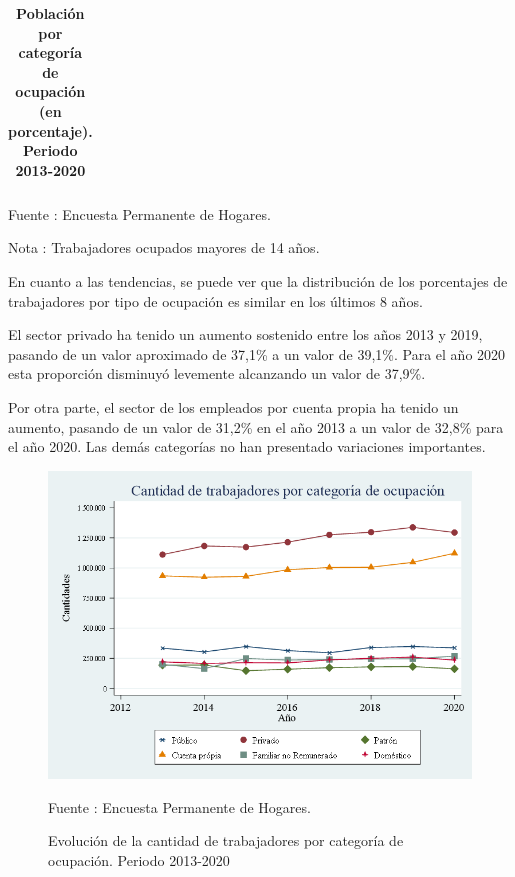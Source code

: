 \begin{table}[H]
\begin{center}
\scriptsize
\caption{\bf{Población por categoría de ocupación (en porcentaje). Periodo 2013-2020}}
\begin{tabular}{l|rrrrrr}

\end{tabular}
                    \item \footnotesize Fuente : Encuesta Permanente de Hogares. 
                    \item \footnotesize Nota : Trabajadores ocupados mayores de 14 años.
\end{center}
\end{table}

En cuanto a las tendencias, se puede ver que la distribución de los
porcentajes de trabajadores por tipo de ocupación es similar en los
últimos 8 años.

El sector privado ha tenido un aumento sostenido entre los años 2013 y
2019, pasando de un valor aproximado de 37,1\% a un valor de 39,1\%.
Para el año 2020 esta proporción disminuyó levemente alcanzando un valor
de 37,9\%.

Por otra parte, el sector de los empleados por cuenta propia ha tenido
un aumento, pasando de un valor de 31,2\% en el año 2013 a un valor de
32,8\% para el año 2020. Las demás categorías no han presentado
variaciones importantes.

\begin{figure}[H]
\begin{center}
                    \caption{Evolución de la cantidad de trabajadores por categoría de ocupación. Periodo 2013-2020}
                    \includegraphics[scale=0.55]{EPH_catepea.png}
                                    \item \footnotesize Fuente : Encuesta Permanente de Hogares.
                    \end{center}
\end{figure}
